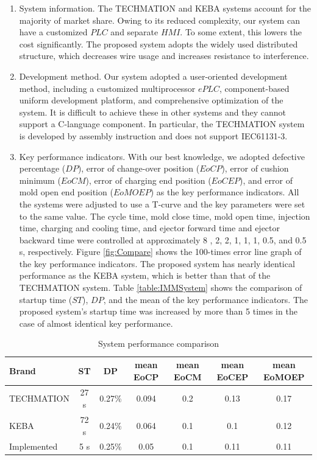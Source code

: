 \documentclass[journal,UTF8]{IEEEtran}
\begin{document}
	\begin{enumerate}
		\item System information. The TECHMATION and KEBA systems account for the majority of market share. Owing to its reduced complexity, our system can have a customized $PLC$ and separate $HMI$. To some extent, this lowers the cost significantly. The proposed system adopts the widely used distributed structure, which decreases wire usage and increases resistance to interference.
		\item Development method. Our system adopted a user-oriented development method, including a customized multiprocessor $ePLC$, component-based uniform development platform, and comprehensive optimization of the system. It is difficult to achieve these in other systems and they cannot support a C-language component. In particular, the TECHMATION system is developed by assembly instruction and does not support IEC61131-3.
		\item Key performance indicators. With our best knowledge, we adopted defective percentage ($DP$), error of change-over position ($EoCP$), error of cushion minimum ($EoCM$), error of charging end position ($EoCEP$), and error of mold open end position ($EoMOEP$) as the key performance indicators. All the systems were adjusted to use a T-curve and the key parameters were set to the same value. The cycle time, mold close time, mold open time, injection time, charging and cooling time, and ejector forward time and ejector backward time were controlled at approximately 8 , 2, 2, 1, 1, 1, 0.5, and 0.5 s, respectively. Figure \ref{fig:Compare} shows the 100-times error line graph of the key performance indicators. The proposed system has nearly identical performance as the KEBA system, which is better than that of the TECHMATION system. Table \ref{table:IMMSystem} shows the comparison of startup time ($ST$), $DP$, and the mean of the key performance indicators. The proposed system's startup time was increased by more than 5 times in the case of almost identical key performance.
	\end{enumerate}
	\begin{table}
		\scriptsize \caption{System performance comparison}
		\label{table:ComparisonG}
		\begin{center}
			\renewcommand{\arraystretch}{1.4}
			\setlength\tabcolsep{3pt}
			\begin{tabular}{|l|c|c|c|c|c|c|}
				\hline
				Brand & ST &DP&mean EoCP&mean EoCM&mean EoCEP&mean EoMOEP\\
				\hline
				TECHMATION  & 27 s  &0.27\% &0.094 & 0.2 & 0.13 & 0.17 \\
				\hline
				KEBA        & 72 s  &0.24\% &0.064 & 0.1 & 0.1 & 0.12 \\
				\hline
				Implemented   & 5 s     &0.25\% &0.05 & 0.1 & 0.11 & 0.11\\
				\hline
			\end{tabular}
		\end{center}
	\end{table}
	
\end{document}
